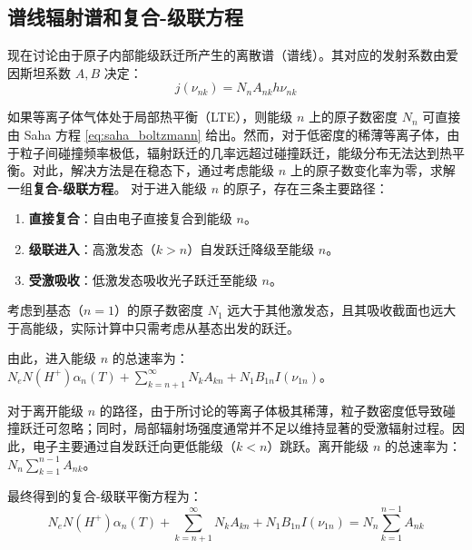 \subsection{谱线辐射谱和复合-级联方程}

现在讨论由于原子内部能级跃迁所产生的离散谱（谱线）。其对应的发射系数由爱因斯坦系数 $A, B$ 决定：
\begin{equation}
    j(\nu_{nk}) = N_n A_{nk} h\nu_{nk}
\end{equation}

如果等离子体气体处于局部热平衡（LTE），则能级 $n$ 上的原子数密度 $N_n$ 可直接由 Saha 方程 \eqref{eq:saha_boltzmann} 给出。然而，对于低密度的稀薄等离子体，由于粒子间碰撞频率极低，辐射跃迁的几率远超过碰撞跃迁，能级分布无法达到热平衡。对此，解决方法是在稳态下，通过考虑能级 $n$ 上的原子数变化率为零，求解一组\textbf{复合-级联方程}。
对于进入能级 $n$ 的原子，存在三条主要路径：
\begin{enumerate}
    \item \textbf{直接复合}：自由电子直接复合到能级 $n$。
    \item \textbf{级联进入}：高激发态（$k > n$）自发跃迁降级至能级 $n$。
    \item \textbf{受激吸收}：低激发态吸收光子跃迁至能级 $n$。
\end{enumerate}
考虑到基态（$n=1$）的原子数密度 $N_1$ 远大于其他激发态，且其吸收截面也远大于高能级，实际计算中只需考虑从基态出发的跃迁。

由此，进入能级 $n$ 的总速率为：$N_e N(H^+) \alpha_n(T) + \sum_{k=n+1}^{\infty} N_k A_{kn} + N_1 B_{1n} I(\nu_{1n})$。

对于离开能级 $n$ 的路径，由于所讨论的等离子体极其稀薄，粒子数密度低导致碰撞跃迁可忽略；同时，局部辐射场强度通常并不足以维持显著的受激辐射过程。因此，电子主要通过自发跃迁向更低能级（$k < n$）跳跃。离开能级 $n$ 的总速率为：$N_n \sum_{k=1}^{n-1} A_{nk}$。

最终得到的复合-级联平衡方程为：
\begin{equation}\label{eq:cascade_eq}
    N_e N(H^+) \alpha_n(T) + \sum_{k=n+1}^{\infty} N_k A_{kn} + N_1 B_{1n} I(\nu_{1n}) = N_n \sum_{k=1}^{n-1} A_{nk}
\end{equation}

